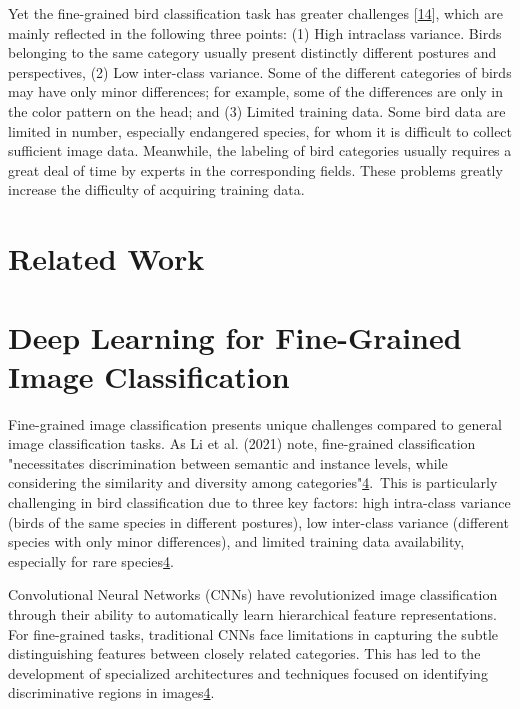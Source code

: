 \documentclass[a4paper,12pt]{article}
\begin{document}
Yet the fine-grained bird classification task has greater challenges [\href{https://www.mdpi.com/2076-2615/13/2/264#B14-animals-13-00264}{14}], which are mainly reflected in the following three points: (1) High intraclass variance. Birds belonging to the same category usually present distinctly different postures and perspectives, (2) Low inter-class variance. Some of the different categories of birds may have only minor differences; for example, some of the differences are only in the color pattern on the head; and (3) Limited training data. Some bird data are limited in number, especially endangered species, for whom it is difficult to collect sufficient image data. Meanwhile, the labeling of bird categories usually requires a great deal of time by experts in the corresponding fields. These problems greatly increase the difficulty of acquiring training data.

   
\newpage
\section{Related Work}


\section{Deep Learning for Fine-Grained Image Classification}
Fine-grained image classification presents unique challenges compared to general image classification tasks. As Li et al. (2021) note, fine-grained classification "necessitates discrimination between semantic and instance levels, while considering the similarity and diversity among categories"\href{https://www.frontiersin.org/journals/neurorobotics/articles/10.3389/fnbot.2024.1391791/full}{4}. This is particularly challenging in bird classification due to three key factors: high intra-class variance (birds of the same species in different postures), low inter-class variance (different species with only minor differences), and limited training data availability, especially for rare species\href{https://www.frontiersin.org/journals/neurorobotics/articles/10.3389/fnbot.2024.1391791/full}{4}.

Convolutional Neural Networks (CNNs) have revolutionized image classification through their ability to automatically learn hierarchical feature representations. For fine-grained tasks, traditional CNNs face limitations in capturing the subtle distinguishing features between closely related categories. This has led to the development of specialized architectures and techniques focused on identifying discriminative regions in images\href{https://www.frontiersin.org/journals/neurorobotics/articles/10.3389/fnbot.2024.1391791/full}{4}.
\end{document}
